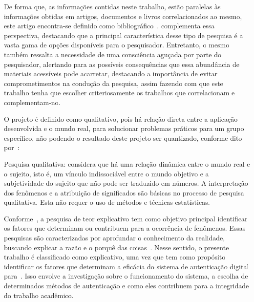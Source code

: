 
De forma que, as informações contidas neste trabalho, estão paralelas
às informações obtidas em artigos, documentos e livros correlacionados
ao mesmo, este artigo encontra-se definido como bibliográfico~\cite{
    prodanov2013}.
\textcite{gil2017} complementa essa perspectiva, destacando que a principal
característica desse tipo de pesquisa é a vasta gama de opções disponíveis
para o pesquisador.
Entretanto, o mesmo também ressalta a necessidade de uma consciência aguçada
por parte do pesquisador, alertando para as possíveis consequências que essa
abundância de materiais acessíveis pode acarretar, destacando a importância de
evitar comprometimentos na condução da pesquisa, assim fazendo com que este
trabalho
tenha que escolher criteriosamente os trabalhos que correlacionam e
complementam-no.

O projeto é definido como qualitativo, pois há relação direta entre
a aplicação desenvolvida e o mundo real, para solucionar problemas práticos
para um grupo específico, não podendo o resultado deste projeto ser quantizado,
conforme dito por~\textcite{prodanov2013}:
\begin{citacao}
    Pesquisa qualitativa: considera que há uma relação dinâmica
    entre o mundo real e o sujeito, isto é, um vínculo indissociável
    entre o mundo objetivo e a subjetividade do sujeito que não pode
    ser traduzido em números.
    A interpretação dos fenômenos e a atribuição de significados são
    básicas no processo de pesquisa qualitativa.
    Esta não requer o uso de métodos e técnicas estatísticas.
    \cite[p.~70]{prodanov2013}
\end{citacao}

Conforme~\textcite{gil2017}, a pesquisa de teor explicativo tem como objetivo
principal
identificar os fatores que determinam ou contribuem para a ocorrência de
fenômenos.
Essas pesquisas são caracterizadas por aprofundar o conhecimento da realidade,
buscando explicar a razão e o porquê das coisas~\cite{gil2017}.
Nesse sentido, o presente trabalho é classificado como explicativo,
uma vez que tem como propósito identificar os fatores que determinam a
eficácia do sistema de autenticação digital para~.
Isso envolve a investigação sobre o funcionamento do sistema, a escolha de
determinados métodos de autenticação e como eles contribuem para a integridade
do trabalho acadêmico.

